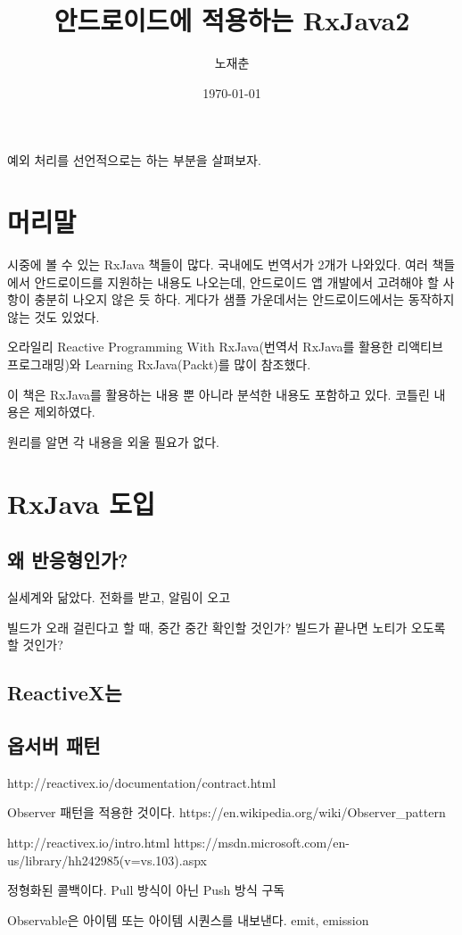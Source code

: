 \documentclass{book}
\title{안드로이드에 적용하는 RxJava2}
\author{노재춘}
\date{\today}
\begin{document}
 
\maketitle
예외 처리를 선언적으로는 하는 부분을 살펴보자.
\chapter*{머리말}
시중에 볼 수 있는 RxJava 책들이 많다. 국내에도 번역서가 2개가 나와있다. 
여러 책들에서 안드로이드를 지원하는 내용도 나오는데, 안드로이드 앱 개발에서 고려해야 할 사항이 충분히 나오지 않은 듯 하다. 게다가 샘플 가운데서는 안드로이드에서는 동작하지 않는 것도 있었다.

오라일리 Reactive Programming With RxJava(번역서 RxJava를 활용한 리액티브 프로그래밍)와 Learning RxJava(Packt)를 많이 참조했다.

이 책은 RxJava를 활용하는 내용 뿐 아니라 분석한 내용도 포함하고 있다.
코틀린 내용은 제외하였다.

원리를 알면 각 내용을 외울 필요가 없다. 
\tableofcontents



\chapter{RxJava 도입}
\section{왜 반응형인가?}
실세계와 닮았다.
전화를 받고, 알림이 오고

빌드가 오래 걸린다고 할 때, 중간 중간 확인할 것인가? 빌드가 끝나면 노티가 오도록 할 것인가?

\section{ReactiveX는}
\section{옵서버 패턴}
http://reactivex.io/documentation/contract.html

Observer 패턴을 적용한 것이다.
https://en.wikipedia.org/wiki/Observer_pattern

http://reactivex.io/intro.html
https://msdn.microsoft.com/en-us/library/hh242985(v=vs.103).aspx

정형화된 콜백이다.
Pull 방식이 아닌 Push 방식 구독

Observable은 아이템 또는 아이템 시퀀스를 내보낸다.
emit, emission
\end{document}
